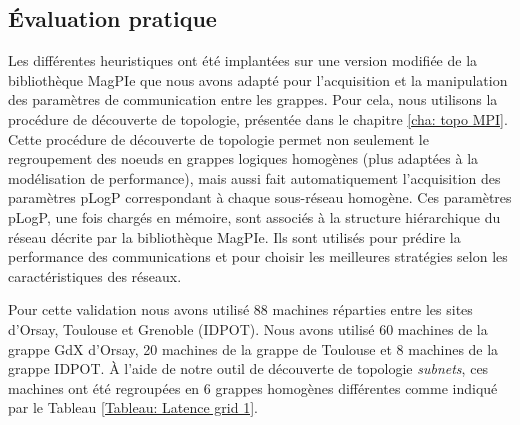\subsection{Évaluation pratique}

Les différentes heuristiques ont été implantées sur une version modifiée
de la bibliothèque MagPIe que nous avons adapté pour l'acquisition
et la manipulation des paramètres de communication entre les grappes.
Pour cela, nous utilisons la procédure de découverte de topologie,
présentée dans le chapitre \ref{cha: topo MPI}. Cette procédure de
découverte de topologie permet non seulement le regroupement des noeuds
en grappes logiques homogènes (plus adaptées à la modélisation de
performance), mais aussi fait automatiquement l'acquisition des paramètres
pLogP correspondant à chaque sous-réseau homogène. Ces paramètres
pLogP, une fois chargés en mémoire, sont associés à la structure hiérarchique
du réseau décrite par la bibliothèque MagPIe. Ils sont utilisés pour
prédire la performance des communications et pour choisir les meilleures
stratégies selon les caractéristiques des réseaux.

Pour cette validation nous avons utilisé 88 machines réparties entre les sites
d'Orsay, Toulouse et Grenoble (IDPOT). Nous avons utilisé 60 machines
de la grappe GdX d'Orsay, 20 machines de la grappe de Toulouse et
8 machines de la grappe IDPOT. À l'aide de notre outil de découverte
de topologie \emph{subnets}, ces machines ont été regroupées en 6
grappes homogènes différentes comme indiqué par le Tableau \ref{Tableau: Latence grid 1}. 

%	
%	
%


